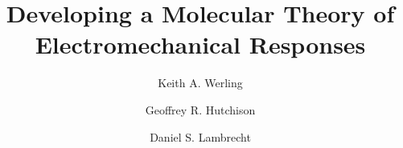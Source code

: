 \documentclass[jcp,twocolumn]{revtex4}
\begin{document}
\title{Developing a Molecular Theory of Electromechanical Responses}
\author{Keith A. Werling}
\author{Geoffrey R. Hutchison}
\author{Daniel S. Lambrecht}


\maketitle









\begin{appendix}
  
\end{appendix}






\end{document}

